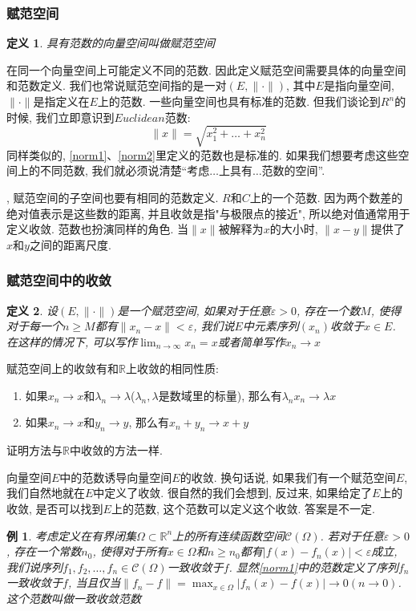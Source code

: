 \documentclass[a4paper,11pt]{article}
\newtheorem{definition}{\hspace{2em}定义}[section]
\newtheorem{example}{例}[section]
\begin{document}
\subsubsection*{赋范空间}
\begin{definition}
  具有范数的向量空间叫做赋范空间
\end{definition}
在同一个向量空间上可能定义不同的范数. 因此定义赋范空间需要具体的向量空间和范数定义. 我们也常说赋范空间指的是一对$(E,\|\cdot\|)$, 其中$E$是指向量空间, $\|\cdot\|$是指定义在$E$上的范数. 一些向量空间也具有标准的范数. 但我们谈论到$R^n$的时候, 我们立即意识到$Euclidean$范数:
\begin{equation*}
  \|x\|=\sqrt{x_1^2+\dots+x_n^2}
\end{equation*}
同样类似的, \ref{norm1}、\ref{norm2}里定义的范数也是标准的. 如果我们想要考虑这些空间上的不同范数, 我们就必须说清楚“考虑$\dots$上具有$\dots$范数的空间”.

, 赋范空间的子空间也要有相同的范数定义.
$R$和$C$上的一个范数. 因为两个数差的绝对值表示是这些数的距离, 并且收敛是指"与极限点的接近", 所以绝对值通常用于定义收敛. 范数也扮演同样的角色. 当$\|x\|$被解释为$x$的大小时, $\|x-y\|$提供了$x$和$y$之间的距离尺度.
\subsubsection*{赋范空间中的收敛}
\begin{definition}
  设$(E,\|\cdot\|)$是一个赋范空间, 如果对于任意$\varepsilon>0$, 存在一个数$M$, 使得对于每一个$n\geq M$都有$\|x_n-x\|<\varepsilon$, 我们说$E$中元素序列$(x_n)$收敛于$x\in E$. 在这样的情况下, 可以写作$\lim_{n\to \infty} x_n=x$或者简单写作$x_n\to x$
\end{definition}
赋范空间上的收敛有和$\mathbb{R}$上收敛的相同性质:
\begin{enumerate}
  \item 如果$x_n\to x$和$\lambda_n\to\lambda$($\lambda_n,\lambda$是数域里的标量), 那么有$\lambda_n x_n\to\lambda x$
  \item 如果$x_n\to x$和$y_n\to y$, 那么有$x_n+y_n\to x+y$
\end{enumerate}
证明方法与$\mathbb{R}$中收敛的方法一样.

\indent 向量空间$E$中的范数诱导向量空间$E$的收敛. 换句话说, 如果我们有一个赋范空间$E$,我们自然地就在$E$中定义了收敛. 很自然的我们会想到, 反过来, 如果给定了$E$上的收敛, 是否可以找到$E$上的范数, 这个范数可以定义这个收敛. 答案是不一定.
\begin{example}
  考虑定义在有界闭集$\Omega\subset \mathbb{R}^n$上的所有连续函数空间$\mathcal{C}(\Omega)$. 若对于任意$\varepsilon>0$, 存在一个常数$n_0$, 使得对于所有$x\in\Omega$和$n\geq n_0$都有$|f(x)-f_n(x)|<\varepsilon$成立, 我们说序列$f_1,f_2,\dots,f_n\in\mathcal{C}(\Omega)$一致收敛于$f$. 显然\ref{norm1}中的范数定义了序列$f_n$一致收敛于$f$, 当且仅当$\|f_n-f\|=\max_{x\in\Omega}|f_n(x)-f(x)|\to 0(n\to 0)$. 这个范数叫做一致收敛范数
\end{example}
\end{document}
